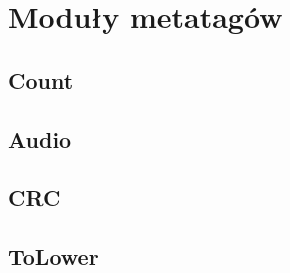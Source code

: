 \section{Moduły metatagów}
\subsection{Count}
\subsection{Audio}
\subsection{CRC}
\subsection{ToLower}

\label{}
